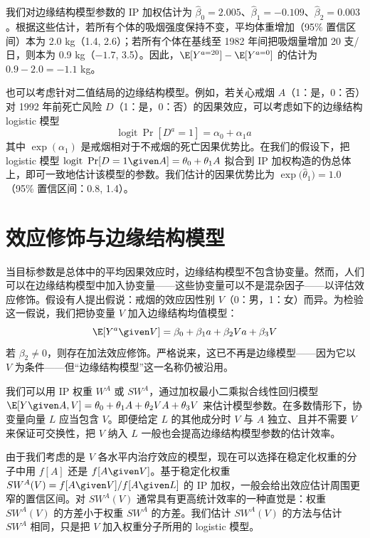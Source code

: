 我们对边缘结构模型参数的 IP 加权估计为 $\hat\beta_0=2.005$、$\hat\beta_1=-0.109$、$\hat\beta_2=0.003$。根据这些估计，若所有个体的吸烟强度保持不变，平均体重增加（95\% 置信区间）本为 2.0 kg（1.4, 2.6）；若所有个体在基线至 1982 年间把吸烟量增加 20 支/日，则本为 0.9 kg（$-1.7$, 3.5）。因此，$\E[Y^{a=20}]-\E[Y^{a=0}]$ 的估计为 $0.9-2.0=-1.1$ kg。

也可以考虑针对二值结局的边缘结构模型。例如，若关心戒烟 $A$（1：是，0：否）对 1992 年前死亡风险 $D$（1：是，0：否）的因果效应，可以考虑如下的边缘结构 logistic 模型
\[
\mathrm{logit}\ \Pr[D^{a}=1]=\alpha_0+\alpha_1a
\]
其中 $\exp(\alpha_1)$ 是戒烟相对于不戒烟的死亡因果优势比。在我们的假设下，把 logistic 模型 $\mathrm{logit}\ \Pr[D=1\given A]=\theta_0+\theta_1A$ 拟合到 IP 加权构造的伪总体上，即可一致地估计该模型的参数。我们估计的因果优势比为 $\exp\bigl(\hat\theta_1\bigr)=1.0$（95\% 置信区间：0.8, 1.4）。

\section{效应修饰与边缘结构模型}

当目标参数是总体中的平均因果效应时，边缘结构模型不包含协变量。然而，人们可以在边缘结构模型中加入协变量——这些协变量可以不是混杂因子——以评估效应修饰。假设有人提出假说：戒烟的效应因性别 $V$（0：男，1：女）而异。为检验这一假说，我们把协变量 $V$ 加入边缘结构均值模型：
\[
\E[Y^{a}\given V]=\beta_0+\beta_1a+\beta_2Va+\beta_3V
\]
若 $\beta_2\neq 0$，则存在加法效应修饰。严格说来，这已不再是边缘模型——因为它以 $V$ 为条件——但“边缘结构模型”这一名称仍被沿用。

我们可以用 IP 权重 $W^{A}$ 或 $SW^{A}$，通过加权最小二乘拟合线性回归模型 $\E[Y\given A,V]=\theta_0+\theta_1A+\theta_2VA+\theta_3V$ 来估计模型参数。在多数情形下，协变量向量 $L$ 应当包含 $V$。即便给定 $L$ 的其他成分时 $V$ 与 $A$ 独立、且并不需要 $V$ 来保证可交换性，把 $V$ 纳入 $L$ 一般也会提高边缘结构模型参数的估计效率。

由于我们考虑的是 $V$ 各水平内治疗效应的模型，现在可以选择在稳定化权重的分子中用 $f[A]$ 还是 $f[A\given V]$。基于稳定化权重 $SW^{A}(V)=f[A\given V]/f[A\given L]$ 的 IP 加权，一般会给出效应估计周围更窄的置信区间。对 $SW^{A}(V)$ 通常具有更高统计效率的一种直觉是：权重 $SW^{A}(V)$ 的方差小于权重 $SW^{A}$ 的方差。我们估计 $SW^{A}(V)$ 的方法与估计 $SW^{A}$ 相同，只是把 $V$ 加入权重分子所用的 logistic 模型。

